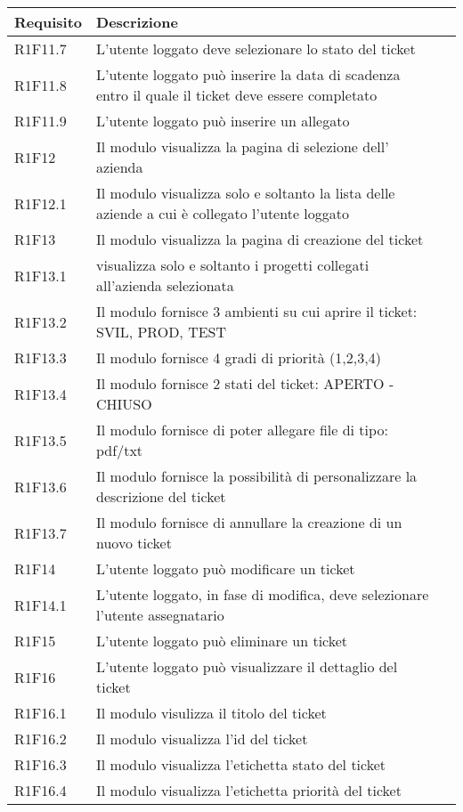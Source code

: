 \begin{table}[H]
{\renewcommand{\arraystretch}{2}%
\begin{tabularx}{\textwidth}{PXl}
\hline\hline
\textbf{Requisito} & \textbf{Descrizione}\\

\hline
R1F11.7 & L'utente loggato deve selezionare lo stato del ticket\\
\hline
R1F11.8 & L'utente loggato può inserire la data di scadenza entro il quale il ticket deve essere completato\\
\hline
R1F11.9 & L'utente loggato può inserire un allegato\\
\hline
R1F12 & Il modulo visualizza la pagina di selezione dell' azienda \\
\hline
R1F12.1 & Il modulo visualizza solo e soltanto la lista delle aziende a cui è collegato l'utente loggato \\
\hline
R1F13 & Il modulo visualizza la pagina di creazione del ticket\\
\hline
R1F13.1 & visualizza solo e soltanto i progetti collegati all'azienda selezionata\\
\hline
R1F13.2 & Il modulo fornisce 3 ambienti su cui aprire il ticket: SVIL, PROD, TEST\\
\hline
R1F13.3 & Il modulo fornisce 4 gradi di priorità (1,2,3,4)\\
\hline
R1F13.4 & Il modulo fornisce 2 stati del ticket: APERTO - CHIUSO\\
\hline
R1F13.5 & Il modulo fornisce di poter allegare file di tipo: pdf/txt\\
\hline
R1F13.6 & Il modulo fornisce la possibilità di personalizzare la descrizione del ticket\\
\hline
R1F13.7 & Il modulo fornisce di annullare la creazione di un nuovo ticket\\
\hline
R1F14 & L'utente loggato può modificare un ticket\\
\hline
R1F14.1 & L'utente loggato, in fase di modifica, deve selezionare l'utente assegnatario\\
\hline
R1F15 & L'utente loggato può eliminare un ticket\\
\hline
R1F16 & L'utente loggato può visualizzare il dettaglio del ticket\\
\hline
R1F16.1 & Il modulo visulizza il titolo del ticket\\
\hline
R1F16.2 & Il modulo visualizza l'id del ticket\\
\hline
R1F16.3 & Il modulo visualizza l'etichetta stato del ticket\\
\hline
R1F16.4 & Il modulo visualizza l'etichetta priorità del ticket\\
\hline


\end{tabularx}
}
\end{table}

